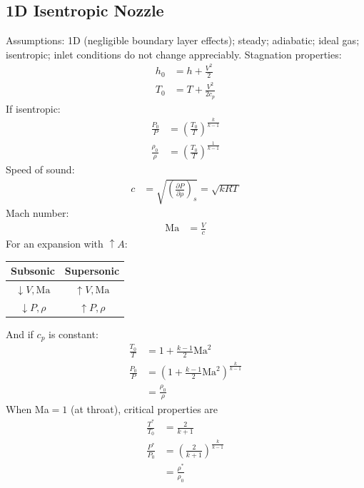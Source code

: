 \subsection{1D Isentropic Nozzle}
Assumptions: 1D (negligible boundary layer effects); steady; adiabatic; ideal gas; isentropic; inlet conditions do not change appreciably.
Stagnation properties:
\begin{align*}
    h_0 &= h + \frac{V^2}{2} \\
    T_0 &= T+ \frac{V^2}{2 c_p} 
\end{align*}
If isentropic:
\begin{align*}
    \frac{P_0}{P} &= \left(\frac{T_0}{T}\right)^{\frac{k}{k-1}} \\
    \frac{\rho_0}{\rho} &= \left(\frac{T_0}{T}\right)^{\frac{1}{k-1}}
\end{align*}
Speed of sound:
\begin{align*}
    c &= \sqrt{\left(\frac{\partial P}{\partial \rho}\right)_s} = \sqrt{k R T}
\end{align*}
Mach number:
\begin{align*}
    \text{Ma} &= \frac{V}{c}
\end{align*}
For an expansion with $\uparrow A$:
\vspace{-15pt}
\begin{table}[H]
    \centering
    \footnotesize
    \begin{tabular}{cc}
        \toprule
        Subsonic & Supersonic \\
        \midrule
        $\downarrow V, \text{Ma}$ & $\uparrow V, \text{Ma}$ \\
        $\downarrow P, \rho$ & $\uparrow P, \rho$ \\
        \bottomrule
    \end{tabular}
\end{table} \vspace{-25pt}
And if $c_p$ is constant:
\begin{align*}
    \frac{T_0}{T} &= 1 + \frac{k-1}{2} \text{Ma}^2 \\
    \frac{P_0}{P} &= \left(1 + \frac{k-1}{2} \text{Ma}^2\right)^{\frac{k}{k-1}} \\
    &= \frac{\rho_0}{\rho}
\end{align*}
When Ma$=1$ (at throat), critical properties are 
\begin{align*}
    \frac{T^*}{T_0} &= \frac{2}{k+1} \\
    \frac{P^*}{P_0} &= \left(\frac{2}{k+1}\right)^{\frac{k}{k-1}} \\
    &= \frac{\rho^*}{\rho_0}
\end{align*}
